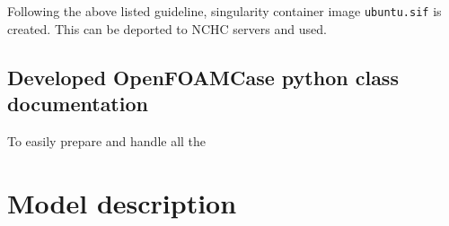 Following the above listed guideline, singularity container image \texttt{ubuntu.sif} is created. This can be deported to NCHC servers and used. 

\subsection{Developed OpenFOAMCase python class documentation}
\label{subsec:ofCaseClass}
To easily prepare and handle all the 

\section{Model description}
\label{sec:modDesc}


